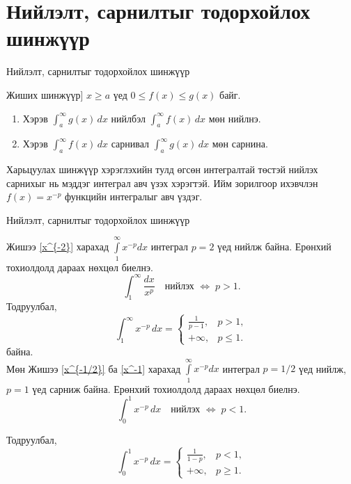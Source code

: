 \section{Нийлэлт, сарнилтыг тодорхойлох шинжүүр}
\begin{frame}[allowframebreaks]{Нийлэлт, сарнилтыг тодорхойлох шинжүүр}
\begin{theorem}Жиших шинжүүр]
$x\ge a$ үед $0\le f(x)\le g(x)$ байг.

\begin{enumerate}
\item Хэрэв $\displaystyle\int_{a}^{\infty} g(x)\,dx$ нийлбэл  
\quad $\displaystyle\int_{a}^{\infty} f(x)\,dx$ мөн нийлнэ.
\item Хэрэв $\displaystyle\int_{a}^{\infty} f(x)\,dx$ сарнивал  
\quad $\displaystyle\int_{a}^{\infty} g(x)\,dx$ мөн сарнина.
\end{enumerate}
\end{theorem}
Харьцуулах шинжүүр хэрэглэхийн тулд өгсөн интегралтай төстэй нийлэх сарнихыг нь мэддэг интеграл авч үзэх хэрэгтэй. Ийм зорилгоор ихэвчлэн $f(x)=x^{-p}$ функцийн интегралыг авч үздэг.
\end{frame}

\begin{frame}[allowframebreaks]{Нийлэлт, сарнилтыг тодорхойлох шинжүүр}
\begin{example}
 Жишээ \ref{x^{-2}} харахад $\displaystyle\int\limits_1^{\infty}x^{-p}dx$ интеграл $p=2$ үед нийлж байна. Ерөнхий тохиолдолд дараах нөхцөл биелнэ.
 \[
\int_{1}^{\infty} \frac{dx}{x^{p}}
\quad\text{нийлэх } \Longleftrightarrow\; p>1.
\]
Тодруулбал,
\[
\int_{1}^{\infty} x^{-p}\,dx =
\begin{cases}
\displaystyle \frac{1}{p-1}, & p>1,\\[4pt]
+\infty, & p\le1.
\end{cases}
\] байна. \\
Мөн Жишээ \ref{x^{-1/2}} ба  \ref{x^-1}  харахад $\displaystyle\int\limits_1^{\infty}x^{-p} dx$ интеграл $p= 1/2$ үед нийлж, $p=1$ үед сарниж байна. Ерөнхий тохиолдолд дараах нөхцөл биелнэ.
 \[
\int_{0}^{1} x^{-p}\,dx
\quad\text{нийлэх } \Longleftrightarrow\; p<1.
\]

Тодруулбал,
\[
\int_{0}^{1} x^{-p}\,dx =
\begin{cases}
\displaystyle \frac{1}{1-p}, & p<1,\\[4pt]
+\infty, & p\ge1.
\end{cases}
\]
\end{example}
\end{frame}

